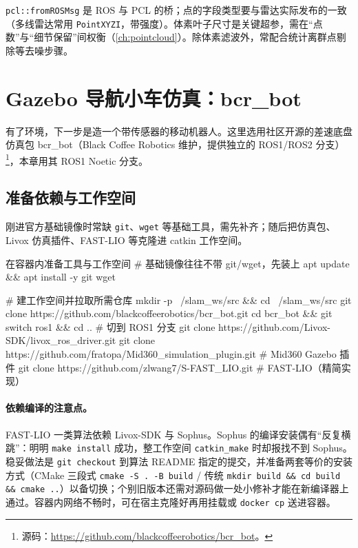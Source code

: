 \verb|pcl::fromROSMsg| 是 ROS 与 PCL 的桥；点的字段类型要与雷达实际发布的一致（多线雷达常用 \verb|PointXYZI|，带强度）。体素叶子尺寸是关键超参，需在“点数”与“细节保留”间权衡（\cref{ch:pointcloud}）。除体素滤波外，常配合统计离群点剔除等去噪步骤。

\section{Gazebo 导航小车仿真：bcr\_bot}

有了环境，下一步是造一个带传感器的移动机器人。这里选用社区开源的差速底盘仿真包 bcr\_bot（Black Coffee Robotics 维护，提供独立的 ROS1/ROS2 分支）\footnote{源码：\url{https://github.com/blackcoffeerobotics/bcr_bot}。}，本章用其 ROS1 Noetic 分支。

\subsection{准备依赖与工作空间}

刚进官方基础镜像时常缺 \verb|git|、\verb|wget| 等基础工具，需先补齐；随后把仿真包、Livox 仿真插件、FAST-LIO 等克隆进 catkin 工作空间。

\begin{codebox}[bash]{在容器内准备工具与工作空间}
# 基础镜像往往不带 git/wget，先装上
apt update && apt install -y git wget

# 建工作空间并拉取所需仓库
mkdir -p ~/slam_ws/src && cd ~/slam_ws/src
git clone https://github.com/blackcoffeerobotics/bcr_bot.git
cd bcr_bot && git switch ros1 && cd ..               # 切到 ROS1 分支
git clone https://github.com/Livox-SDK/livox_ros_driver.git
git clone https://github.com/fratopa/Mid360_simulation_plugin.git   # Mid360 Gazebo 插件
git clone https://github.com/zlwang7/S-FAST_LIO.git  # FAST-LIO（精简实现）
\end{codebox}

\paragraph{依赖编译的注意点。}FAST-LIO 一类算法依赖 Livox-SDK 与 Sophus。Sophus 的编译安装偶有“反复横跳”：明明 \verb|make install| 成功，整工作空间 \verb|catkin_make| 时却报找不到 Sophus。稳妥做法是 \verb|git checkout| 到算法 README 指定的提交，并准备两套等价的安装方式（CMake 三段式 \verb|cmake -S . -B build| / 传统 \verb|mkdir build && cd build && cmake ..|）以备切换；个别旧版本还需对源码做一处小修补才能在新编译器上通过。容器内网络不畅时，可在宿主克隆好再用挂载或 \verb|docker cp| 送进容器。

